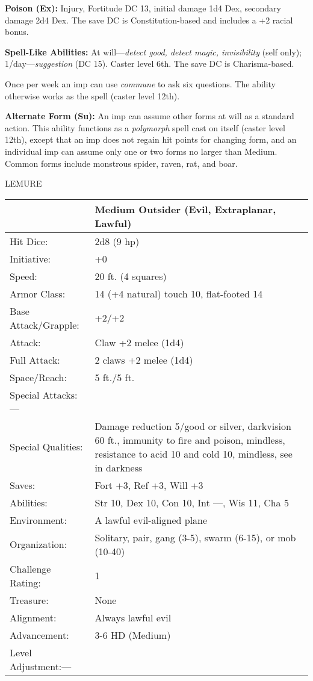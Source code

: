 \documentclass{article}
\begin{document}
\textbf{Poison (Ex):} Injury, Fortitude DC 13, initial damage 1d4 Dex, secondary 
damage 2d4 Dex. The save DC is Constitution-based and includes a +2 racial bonus.

\textbf{Spell-Like Abilities:} At will---\textit{detect good, detect magic, invisibility 
}(self only); 1/day---\textit{suggestion }(DC 15). Caster level 6th. The save DC 
is Charisma-based.

Once per week an imp can use \textit{commune }to ask six questions. The ability 
otherwise works as the spell (caster level 12th).

\textbf{Alternate Form (Su):} An imp can assume other forms at will as a standard 
action. This ability functions as a \textit{polymorph }spell cast on itself (caster 
level 12th), except that an imp does not regain hit points for changing form, and 
an individual imp can assume only one or two forms no larger than Medium. Common 
forms include monstrous spider, raven, rat, and boar.

\vspace{12pt}
LEMURE

\begin{tabular}{|>{\raggedright}p{85pt}|>{\raggedright}p{206pt}|}
\hline
  & Medium Outsider (Evil, Extraplanar, Lawful)\tabularnewline
\hline
Hit Dice: & 2d8 (9 hp)\tabularnewline
\hline
Initiative: & +0\tabularnewline
\hline
Speed: & 20 ft. (4 squares)\tabularnewline
\hline
Armor Class: & 14 (+4 natural) touch 10, flat-footed 14\tabularnewline
\hline
Base Attack/Grapple: & +2/+2\tabularnewline
\hline
Attack: & Claw +2 melee (1d4)\tabularnewline
\hline
Full Attack: & 2 claws +2 melee (1d4)\tabularnewline
\hline
Space/Reach: & 5 ft./5 ft.\tabularnewline
\hline
Special Attacks:--- & \tabularnewline
\hline
Special Qualities: & Damage reduction 5/good or silver, darkvision 60 ft., immunity 
to fire and poison, mindless, resistance to acid 10 and cold 10, mindless, see 
in darkness\tabularnewline
\hline
Saves: & Fort +3, Ref +3, Will +3\tabularnewline
\hline
Abilities: & Str 10, Dex 10, Con 10, Int ---, Wis 11, Cha 5\tabularnewline
\hline
Environment: & A lawful evil-aligned plane\tabularnewline
\hline
Organization: & Solitary, pair, gang (3-5), swarm (6-15), or mob (10-40)\tabularnewline
\hline
Challenge Rating: & 1\tabularnewline
\hline
Treasure: & None\tabularnewline
\hline
Alignment: & Always lawful evil\tabularnewline
\hline
Advancement: & 3-6 HD (Medium)\tabularnewline
\hline
Level Adjustment:--- & \tabularnewline
\hline
\end{tabular}
\end{document}
